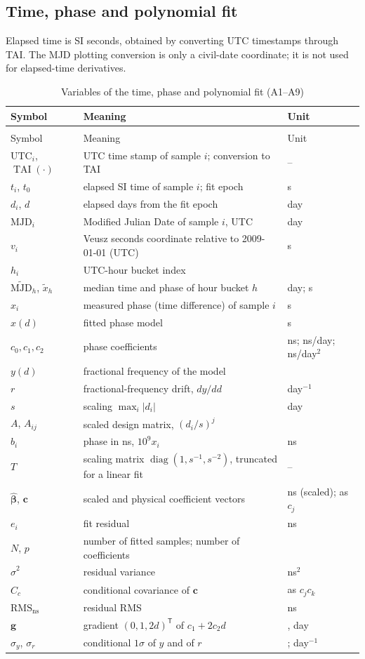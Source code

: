 \documentclass[11pt,a4paper]{article}
\makeatletter
\renewcommand{\_}{\usscore\allowbreak}
\newenvironment{vartable}[2]{%
 \par\small\setlength{\LTpre}{3pt}\setlength{\LTpost}{3pt}%
 \begin{longtable}{@{}>{\raggedright}p{.2\linewidth}>{\raggedright}p{.57\linewidth}>{\raggedright\arraybackslash}p{.17\linewidth}@{}}
 \caption{#2}\label{#1}\\
 \toprule Symbol & Meaning & Unit\\\midrule
 \endfirsthead
 \multicolumn{3}{@{}l}{\footnotesize\itshape Table \thetable{} (continued)}\\
 \toprule Symbol & Meaning & Unit\\\midrule
 \endhead
 \bottomrule
 \endlastfoot}
 {\end{longtable}\normalsize}
\makeatother
\begin{document}
\subsection{Time, phase and polynomial fit}
Elapsed time is SI seconds, obtained by converting UTC timestamps through TAI. The MJD plotting
conversion is only a civil-date coordinate; it is not used for elapsed-time derivatives.
\begin{vartable}{tab:var-A1}{Variables of the time, phase and polynomial fit (A1--A9)}
\(\mathrm{UTC}_i\), \(\operatorname{TAI}(\cdot)\) & UTC time stamp of sample \(i\); conversion to TAI & --\\
\(t_i\), \(t_0\) & elapsed SI time of sample \(i\); fit epoch & s\\
\(d_i\), \(d\) & elapsed days from the fit epoch & day\\
\(\mathrm{MJD}_i\) & Modified Julian Date of sample \(i\), UTC & day\\
\(v_i\) & Veusz seconds coordinate relative to 2009-01-01 (UTC) & s\\
\(h_i\) & UTC-hour bucket index & 1\\
\(\widetilde{\mathrm{MJD}}_h\), \(\widetilde x_h\) & median time and phase of hour bucket \(h\) & day; s\\
\(x_i\) & measured phase (time difference) of sample \(i\) & s\\
\(\widehat x(d)\) & fitted phase model & s\\
\(c_0,c_1,c_2\) & phase coefficients & ns; ns/day; ns/day\(^2\)\\
\(y(d)\) & fractional frequency of the model & 1\\
\(r\) & fractional-frequency drift, \(dy/dd\) & day\(^{-1}\)\\
\(s\) & scaling \(\max_i|d_i|\) & day\\
\(A\), \(A_{ij}\) & scaled design matrix, \((d_i/s)^j\) & 1\\
\(b_i\) & phase in ns, \(10^9x_i\) & ns\\
\(T\) & scaling matrix \(\operatorname{diag}(1,s^{-1},s^{-2})\), truncated for a linear fit & --\\
\(\widehat{\boldsymbol\beta}\), \(\mathbf c\) & scaled and physical coefficient vectors & ns (scaled); as \(c_j\)\\
\(e_i\) & fit residual & ns\\
\(N\), \(p\) & number of fitted samples; number of coefficients & 1\\
\(\widehat\sigma^2\) & residual variance & ns\(^2\)\\
\(C_c\) & conditional covariance of \(\mathbf c\) & as \(c_jc_k\)\\
\(\mathrm{RMS}_{\mathrm{ns}}\) & residual RMS & ns\\
\(\mathbf g\) & gradient \((0,1,2d)^{\mathsf T}\) of \(c_1+2c_2d\) & 1, day\\
\(\sigma_y\), \(\sigma_r\) & conditional \(1\sigma\) of \(y\) and of \(r\) & 1; day\(^{-1}\)\\
\end{vartable}
\end{document}
